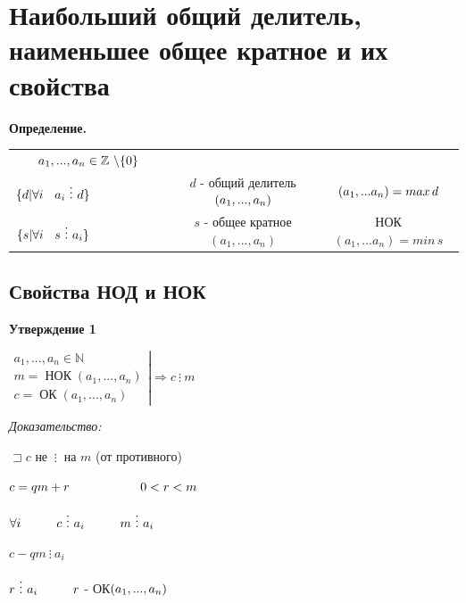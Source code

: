 \documentclass[12pt]{article}
\let\gcd\relax
\DeclareMathOperator{\gcd}{НОД}
\DeclareMathOperator{\lcm}{НОК}
\DeclareMathOperator{\cm}{ОК}
\begin{document}
\section{Наибольший общий делитель, наименьшее общее кратное и их свойства}
\textbf{Определение.}\par
\begin{tabular}{ccc}
    $a_1,...,a_n \in \mathbb{Z} \, \, \backslash \{0\} \vspace{2 ex}$                                                                                                  \\
    $\{ d|\forall i \ \hspace{2 mm} a_i \ \vdots\ d\} \hspace{2 cm}$ & $d$ - общий делитель$(a_1,...,a_n) \vspace{2 ex}$ & $\gcd(a_1,...a_n) = max \, d \vspace{2 ex}$ \\
    $\{ s|\forall i \ \hspace{2 mm} s \ \vdots\ a_i\} \hspace{2 cm}$ & $s$ - общее кратное$(a_1,...,a_n)$                & НОК$(a_1,...a_n) = min \, s $               \\
\end{tabular}\par

\subsection{Свойства НОД и НОК}
\textbf{Утверждение 1}\par
$\left.\begin{array}{l}
        a_1,...,a_n \in \mathbb{N} \\
        m = \lcm(a_1,...,a_n)      \\
        c  = \cm(a_1,...,a_n)
    \end{array}\right| \Rightarrow c\ \vdots\ m$

\textit{Доказательство:}\par
$\sqsupset c$ не $\ \vdots\ $ на $m$ (от противного)\par
$c = qm+r \hspace{2 cm} 0 < r < m$\par
$\forall i \hspace{1 cm} c \ \vdots\  a_i \hspace{1 cm} m \ \vdots\  a_i$\par
$c-qm \ \vdots\  a_i$\par
$r \ \vdots\  a_i \hspace{1 cm} r$ - ОК$(a_1,...,a_n) \newline$\par
\end{document}
